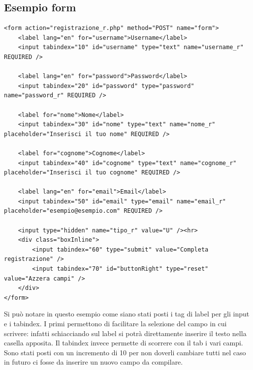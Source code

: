 \documentclass[10pt, a4paper]{article}
\begin{document}
\subsection{Esempio form}
\begin{lstlisting}[caption={registrazione.php},captionpos=b]
<form action="registrazione_r.php" method="POST" name="form">
	<label lang="en" for="username">Username</label>
	<input tabindex="10" id="username" type="text" name="username_r" REQUIRED />
	
	<label lang="en" for="password">Password</label>
	<input tabindex="20" id="password" type="password" name="password_r" REQUIRED />
	
	<label for="nome">Nome</label>
	<input tabindex="30" id="nome" type="text" name="nome_r"  placeholder="Inserisci il tuo nome" REQUIRED />
	
	<label for="cognome">Cognome</label>
	<input tabindex="40" id="cognome" type="text" name="cognome_r" placeholder="Inserisci il tuo cognome" REQUIRED />
	
	<label lang="en" for="email">Email</label>
	<input tabindex="50" id="email" type="email" name="email_r" placeholder="esempio@esempio.com" REQUIRED />
	
	<input type="hidden" name="tipo_r" value="U" /><hr>
	<div class="boxInline">
		<input tabindex="60" type="submit" value="Completa registrazione" />
		<input tabindex="70" id="buttonRight" type="reset" value="Azzera campi" />
	</div>
</form>
\end{lstlisting}


Si può notare in questo esempio come siano stati posti i tag di label per gli input e i tabindex. I primi permettono di facilitare la selezione del campo in cui scrivere: infatti schiacciando sul label si potrà direttamente inserire il testo nella casella apposita. Il tabindex invece permette di scorrere con il tab i vari campi. Sono stati posti con un incremento di 10 per non doverli cambiare tutti nel caso in futuro ci fosse da inserire un nuovo campo da compilare.
\end{document}
